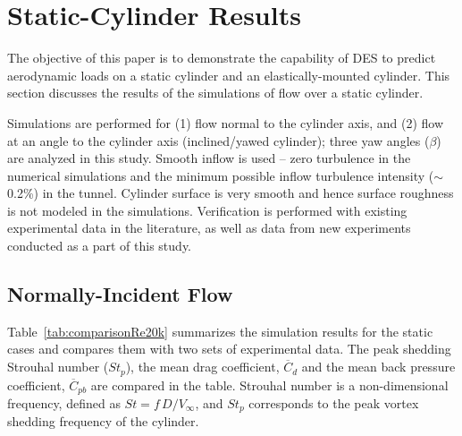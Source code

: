 \section{Static-Cylinder Results}
\label{sec:comp_results}
%
The objective of this paper is to demonstrate the capability of DES to predict
aerodynamic loads on a static cylinder and an elastically-mounted cylinder.
This section discusses the results of the simulations of flow over a static
cylinder.

Simulations are performed for (1) flow normal to the cylinder axis, and (2)
flow at an angle to the cylinder axis (inclined/yawed cylinder); three yaw
angles ($\beta$) are analyzed in this study. Smooth inflow is used -- zero
turbulence in the numerical simulations and the minimum possible inflow
turbulence intensity ($\sim$0.2\%) in the tunnel. Cylinder surface is very
smooth and hence surface roughness is not modeled in the simulations.
Verification is performed with existing experimental data in the literature, as
well as data from new experiments conducted as a part of this study.

\subsection{Normally-Incident Flow}
\label{sec:normally_incident}
%
Table~\ref{tab:comparisonRe20k} summarizes the simulation results for the
static cases and compares them with two sets of experimental data. The peak
shedding Strouhal number ($St_p$), the mean drag coefficient, $\overline{C}_d$
and the mean back pressure coefficient, $\overline{C}_{pb}$ are compared in the
table. Strouhal number is a non-dimensional frequency, defined as $St =
f\,D/V_\infty$, and $St_p$ corresponds to the peak vortex shedding frequency of
the cylinder.


